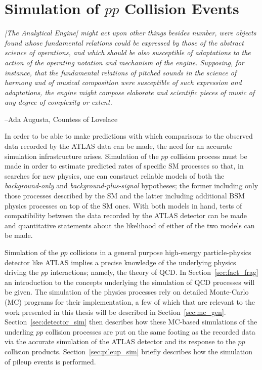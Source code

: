 \chapter{Simulation of $pp$ Collision Events}
\label{chap:simulation}


\epigraph{\textit{[The Analytical Engine] might act upon other things besides number, were objects found whose
fundamental relations could be expressed by those of the abstract science of operations, and which should be also susceptible
of adaptations to the action of the operating notation and mechanism of the engine. Supposing, for instance, that the
fundamental relations of pitched sounds in the science of harmony and of musical composition were susceptible of such
expression and adaptations, the engine might compose elaborate and scientific pieces of music of any degree of
complexity or extent.}}{--Ada Augusta, Countess of Lovelace}


In order to be able to make predictions with which comparisons to the observed data
recorded by the ATLAS data can be made, the need for an accurate simulation infrastructure
arises.
Simulation of the $pp$ collision process must be made in order to estimate predicted
rates of specific SM processes so that, in searches for new physics, one can
construct reliable models of both the \textit{background-only} and \textit{background-plus-signal}
hypotheses; the former including only those processes described by the SM and the latter
including additional BSM physics processes on top of the SM ones.
With both models in hand, tests of compatibility between the data recorded by the ATLAS detector
can be made and quantitative statements about the likelihood of either of the two models can be made.

Simulation of the $pp$ collisions in a general purpose high-energy particle-physics detector
like ATLAS implies a precise knowledge of the underlying physics driving the $pp$ interactions; namely,
the theory of QCD.
In Section~\ref{sec:fact_frag} an introduction to the concepts underlying the simulation of QCD
processes will be given.
The simulation of the physics processes rely on detailed Monte-Carlo (MC) programs for their implementation,
a few of which that are relevant to the work presented in this thesis will be described in Section~\ref{sec:mc_gen}.
Section~\ref{sec:detector_sim} then describes how these MC-based simulations of the underling $pp$ collision processes
are put on the same footing as the recorded data via the accurate simulation of the ATLAS
detector and its response to the $pp$ collision products.
Section~\ref{sec:pileup_sim} briefly describes how the simulation of pileup events is performed.

